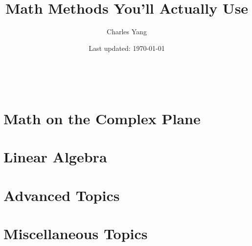 \documentclass[12pt]{book}
\title{Math Methods You'll Actually Use}
\author{Charles Yang}
\date{Last updated: \today}
\begin{document}

\frontmatter

\setcounter{tocdepth}{1}
\tableofcontents
\mainmatter\

\part{Math on the Complex Plane}





\part{Linear Algebra}





\part{Advanced Topics}






\part{Miscellaneous Topics}



\appendix
\end{document}
